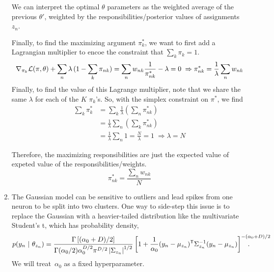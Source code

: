 \begin{enumerate}[label=(\alph*)]
\begin{solution}
We can interpret the optimal $\theta$ parameters as the weighted average of the previous $\theta'$, weighted by the responsibilities/posterior values of assignments $z_n$.

Finally, to find the maximizing argument $\pi_k^*$, we want to first add a Lagrangian multiplier to encoe the constraint that $\sum_k \pi_k = 1$.
\begin{align*}
    \nabla_{\pi_k} \mathcal{L}(\pi, \theta) + \sum_n \lambda\,(1-\sum_k \pi_{nk})
        = \sum_n w_{nk} \frac{1}{\pi_{nk}^*} - \lambda = 0\;
    \Rightarrow \pi_{nk}^* = \frac{1}{\lambda} \sum_n w_{nk}
\end{align*}
Finally, to find the value of this Lagrange multiplier, note that we share the same $\lambda$ for each of the $K$ $\pi_k$'s. So, with the simplex constraint on $\pi^*$, we find
\begin{align*}
    \sum_k \pi_k^*
        &= \sum_k \frac{1}{\lambda} \left(\sum_n \pi_{nk}^*\right) \\
        &= \frac{1}{\lambda} \sum_n \left(\sum_k \pi_{nk}^*\right) \\
        &= \frac{1}{\lambda} \sum_n 1 = \frac{N}{\lambda} = 1 \;
            \Rightarrow \lambda = N
\end{align*}

Therefore, the maximizing responsibilities are just the expected value of expeted value of the responsibilities/weights.
$$ \pi_{nk}^* = \frac{\sum_n w_{nk}}{N} $$

\end{solution}

\clearpage

\item The Gaussian model can be sensitive to outliers and lead spikes from one neuron to be split into two clusters.  One way to side-step this issue is to replace the Gaussian with a heavier-tailed distribution like the multivariate Student's t, which has probability density,
\begin{align*}
    p(y_n \mid \theta_{z_n}) &=  {\frac {\Gamma \left[(\alpha_0 +D)/2\right]}{\Gamma (\alpha_0 /2)\alpha_0 ^{D/2}\pi ^{D/2}\left|{\Sigma_{z_n}}\right|^{1/2}}} \left[1+{\frac{1}{\alpha_0}} (y_n-\mu_{z_n})^\trans \Sigma_{z_n}^{-1}(y_n - \mu_{z_n})\right]^{-(\alpha_0 +D)/2} \hspace{-3.5em}.
\end{align*}
We will treat~$\alpha_0$ as a fixed hyperparameter. 


\end{enumerate}
